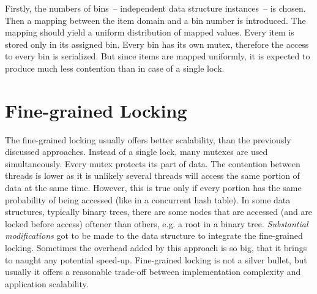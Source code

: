 Firstly, the numbers of bins~-- independent data structure instances~-- is chosen. Then a mapping between the item domain and a bin number is introduced. The mapping should yield a uniform distribution of mapped values. Every item is stored only in its assigned bin. Every bin has its own mutex, therefore the access to every bin is serialized. But since items are mapped uniformly, it is expected to produce much less contention than in case of a single lock.

\section{Fine-grained Locking}

The fine-grained locking usually offers better scalability, than the previously discussed approaches. Instead of a single lock, many mutexes are used simultaneously. Every mutex protects its part of data. The contention between threads is lower as it is unlikely several threads will access the same portion of data at the same time. However, this is true only if every portion has the same probability of being accessed (like in a concurrent hash table). In some data structures, typically binary trees, there are some nodes that are accessed (and are locked before access) oftener than others, e.g. a root in a binary tree. \emph{Substantial modifications} got to be made to the data structure to integrate the fine-grained locking. Sometimes the overhead added by this approach is so big, that it brings to naught any potential speed-up. Fine-grained locking is not a silver bullet, but usually it offers a reasonable trade-off between implementation complexity and application scalability.
